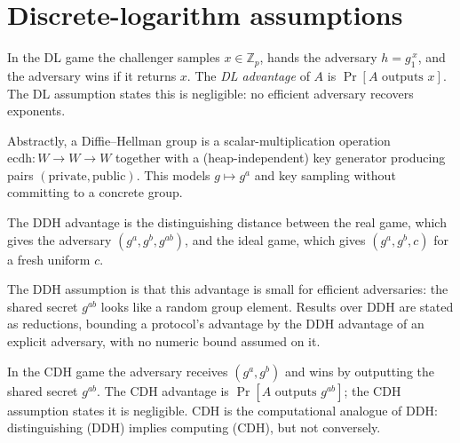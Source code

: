 \section{Discrete-logarithm assumptions}

\begin{definition}
  \label{def:dl}
  \leanok
  In the DL game the challenger samples $x \in \mathbb{Z}_p$, hands the
  adversary $h = g_1^{\,x}$, and the adversary wins if it returns $x$. The
  \emph{DL advantage} of $A$ is $\Pr[\text{$A$ outputs }x]$. The DL assumption
  states this is negligible: no efficient adversary recovers exponents.
\end{definition}

\begin{definition}
  \label{def:ddh-def}
  \leanok
  Abstractly, a Diffie--Hellman group is a scalar-multiplication operation
  $\mathrm{ecdh} : W \to W \to W$ together with a (heap-independent) key
  generator producing pairs $(\text{private}, \text{public})$. This models
  $g \mapsto g^a$ and key sampling without committing to a concrete group.
\end{definition}

\begin{definition}
  \label{def:ddh}
  \leanok
  The DDH advantage is the distinguishing distance between the real game, which
  gives the adversary $(g^a, g^b, g^{ab})$, and the ideal game, which gives
  $(g^a, g^b, c)$ for a fresh uniform $c$.
\end{definition}

The DDH assumption is that this advantage is small for efficient adversaries: the
shared secret $g^{ab}$ looks like a random group element. Results over DDH are stated as
reductions, bounding a protocol's advantage by the DDH advantage of an explicit
adversary, with no numeric bound assumed on it.

\begin{definition}
  \label{def:cdh}
  \leanok
  In the CDH game the adversary receives $(g^a, g^b)$ and wins by outputting the
  shared secret $g^{ab}$. The CDH advantage is $\Pr[\text{$A$ outputs }g^{ab}]$;
  the CDH assumption states it is negligible. CDH is the computational analogue
  of DDH: distinguishing (DDH) implies computing (CDH), but not conversely.
\end{definition}

